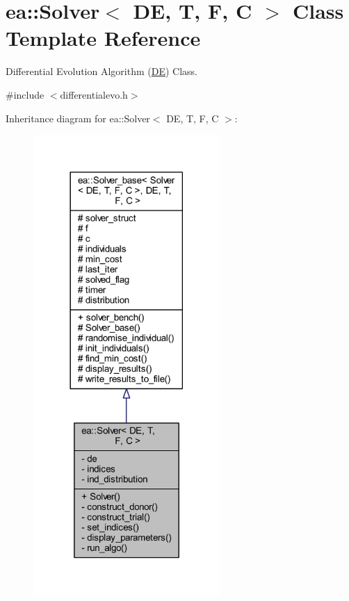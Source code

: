 \hypertarget{classea_1_1_solver_3_01_d_e_00_01_t_00_01_f_00_01_c_01_4}{}\section{ea\+:\+:Solver$<$ DE, T, F, C $>$ Class Template Reference}
\label{classea_1_1_solver_3_01_d_e_00_01_t_00_01_f_00_01_c_01_4}


Differential Evolution Algorithm (\hyperlink{structea_1_1_d_e}{DE}) Class.  




{\ttfamily \#include $<$differentialevo.\+h$>$}



Inheritance diagram for ea\+:\+:Solver$<$ DE, T, F, C $>$\+:
\nopagebreak
\begin{figure}[H]
\begin{center}
\leavevmode
\includegraphics[width=201pt]{classea_1_1_solver_3_01_d_e_00_01_t_00_01_f_00_01_c_01_4__inherit__graph}
\end{center}
\end{figure}
